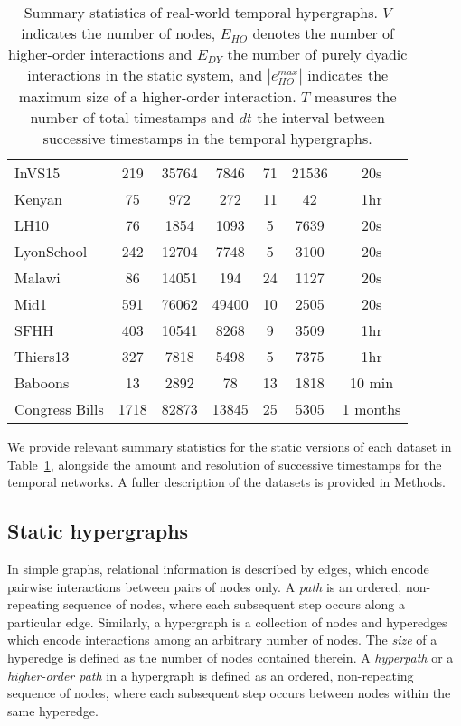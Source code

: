 \documentclass[a4paper,pre,reqno,superscriptaddress, twocolumn, floatfix]{revtex4}
\def\ho{higher-order }
\begin{document}
\begin{table}[hb!]
\begin{tabular}{lcccccc}
    InVS15  & 219  & 35764  & 7846  & 71 & 21536 & 20s \\
    Kenyan  & 75   & 972  & 272   & 11 & 42  & 1hr   \\
    LH10  & 76   & 1854   & 1093  & 5  & 7639  & 20s  \\
    LyonSchool   & 242  & 12704  & 7748  & 5  & 3100  & 20s  \\
    Malawi  & 86   & 14051  & 194   & 24 & 1127  & 20s \\
    Mid1  & 591  & 76062  & 49400 & 10 & 2505  & 20s  \\
    SFHH  & 403  & 10541  & 8268  & 9  & 3509  & 1hr   \\
    Thiers13   & 327  & 7818   & 5498  & 5  & 7375  & 1hr   \\
    Baboons   & 13   & 2892   & 78  & 13 & 1818  & 10 min  \\
    Congress Bills & 1718 & 82873  & 13845 & 25 & 5305  & 1 months   \\
    \hline
    \end{tabular}
    \caption{ \justifying 
    Summary statistics of real-world temporal hypergraphs. {$V$} indicates the number of nodes, {$E_{HO}$} denotes the number of \ho interactions and {$E_{DY}$} the number of purely dyadic interactions in the static system, and {$|e_{HO}^{max}|$} indicates the maximum size of a \ho interaction. {$T$} measures the number of total timestamps and {$dt$} the interval between successive timestamps in the temporal hypergraphs.}
    \label{tbl:summstats}
\end{table}

We provide relevant summary statistics for the static versions of each dataset in Table~\ref{tbl:summstats}, alongside the amount and resolution of successive timestamps for the temporal networks. A fuller description of the datasets is provided in Methods.

\subsection*{Static hypergraphs}\label{sec:static}


In simple graphs, relational information is described by edges, which encode pairwise interactions between pairs of nodes only. 
A \textit{path} is an ordered, non-repeating sequence of nodes, where each subsequent step occurs along a particular edge. 
Similarly, a hypergraph is a collection of nodes and hyperedges which encode interactions among an arbitrary number of nodes. The \textit{size} of a hyperedge is defined as the number of nodes contained therein.
A \textit{hyperpath} or a \textit{\ho path} in a hypergraph is defined as an ordered, non-repeating sequence of nodes, where each subsequent step occurs between nodes within the same hyperedge. 
\end{document}

